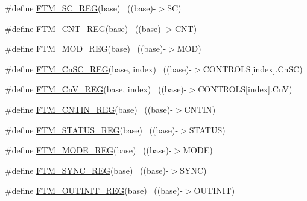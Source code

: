 \begin{DoxyCompactItemize}
\item 
\#define \hyperlink{group___f_t_m___register___accessor___macros_ga0b48df6cbccecf754cc49bb7ea1e3aad}{F\+T\+M\+\_\+\+S\+C\+\_\+\+R\+EG}(base)                                              ~((base)-\/$>$SC)
\item 
\#define \hyperlink{group___f_t_m___register___accessor___macros_ga1ba1654f76ecc24de48047117cb5b45e}{F\+T\+M\+\_\+\+C\+N\+T\+\_\+\+R\+EG}(base)                                            ~((base)-\/$>$C\+NT)
\item 
\#define \hyperlink{group___f_t_m___register___accessor___macros_gabbea5752afc54317fcb50890f8593a49}{F\+T\+M\+\_\+\+M\+O\+D\+\_\+\+R\+EG}(base)                                            ~((base)-\/$>$M\+OD)
\item 
\#define \hyperlink{group___f_t_m___register___accessor___macros_ga49332bccc11dd36d399f3fff66f313b5}{F\+T\+M\+\_\+\+Cn\+S\+C\+\_\+\+R\+EG}(base,  index)                              ~((base)-\/$>$C\+O\+N\+T\+R\+O\+LS\mbox{[}index\mbox{]}.Cn\+SC)
\item 
\#define \hyperlink{group___f_t_m___register___accessor___macros_gaacf8fed24da463653900319184874197}{F\+T\+M\+\_\+\+Cn\+V\+\_\+\+R\+EG}(base,  index)                                ~((base)-\/$>$C\+O\+N\+T\+R\+O\+LS\mbox{[}index\mbox{]}.CnV)
\item 
\#define \hyperlink{group___f_t_m___register___accessor___macros_ga2bac47a7c51c2e7f81edba5a00f949f2}{F\+T\+M\+\_\+\+C\+N\+T\+I\+N\+\_\+\+R\+EG}(base)                                        ~((base)-\/$>$C\+N\+T\+IN)
\item 
\#define \hyperlink{group___f_t_m___register___accessor___macros_gae9cc2c8dd99da090bcbe0039637f4b0d}{F\+T\+M\+\_\+\+S\+T\+A\+T\+U\+S\+\_\+\+R\+EG}(base)                                      ~((base)-\/$>$S\+T\+A\+T\+US)
\item 
\#define \hyperlink{group___f_t_m___register___accessor___macros_ga2b015e87a081f48499ab1becb9c003c9}{F\+T\+M\+\_\+\+M\+O\+D\+E\+\_\+\+R\+EG}(base)                                          ~((base)-\/$>$M\+O\+DE)
\item 
\#define \hyperlink{group___f_t_m___register___accessor___macros_ga749433fea6be26b0ca61150ab722dca0}{F\+T\+M\+\_\+\+S\+Y\+N\+C\+\_\+\+R\+EG}(base)                                          ~((base)-\/$>$S\+Y\+NC)
\item 
\#define \hyperlink{group___f_t_m___register___accessor___macros_ga689e5e15a9b7e64bb944251aeebafddc}{F\+T\+M\+\_\+\+O\+U\+T\+I\+N\+I\+T\+\_\+\+R\+EG}(base)                                    ~((base)-\/$>$O\+U\+T\+I\+N\+IT)

\end{DoxyCompactItemize}
